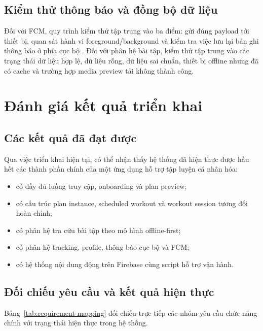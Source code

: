 \subsection{Kiểm thử thông báo và đồng bộ dữ liệu}

Đối với FCM, quy trình kiểm thử tập trung vào ba điểm: gửi đúng payload tới thiết bị, quan sát hành vi foreground/background và kiểm tra việc lưu lại bản ghi thông báo ở phía cục bộ \cite{firebase_fcm}. Đối với phân hệ bài tập, kiểm thử tập trung vào các trạng thái dữ liệu hợp lệ, dữ liệu rỗng, dữ liệu sai chuẩn, thiết bị offline nhưng đã có cache và trường hợp media preview tải không thành công.

\section{Đánh giá kết quả triển khai}

\subsection{Các kết quả đã đạt được}

Qua việc triển khai hiện tại, có thể nhận thấy hệ thống đã hiện thực được hầu hết các thành phần chính của một ứng dụng hỗ trợ tập luyện cá nhân hóa:

\begin{itemize}
    \item có đầy đủ luồng truy cập, onboarding và plan preview;
    \item có cấu trúc plan instance, scheduled workout và workout session tương đối hoàn chỉnh;
    \item có phân hệ tra cứu bài tập theo mô hình offline-first;
    \item có phân hệ tracking, profile, thông báo cục bộ và FCM;
    \item có hệ thống nội dung động trên Firebase cùng script hỗ trợ vận hành.
\end{itemize}

\subsection{Đối chiếu yêu cầu và kết quả hiện thực}

Bảng~\ref{tab:requirement-mapping} đối chiếu trực tiếp các nhóm yêu cầu chức năng chính với trạng thái hiện thực trong hệ thống.

